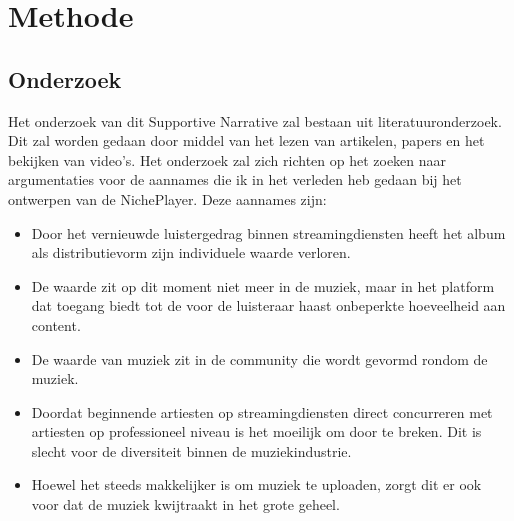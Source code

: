 \section{Methode}

\subsection{Onderzoek}

Het onderzoek van dit Supportive Narrative zal bestaan uit literatuuronderzoek. Dit zal worden gedaan door middel van het lezen van artikelen, papers en het bekijken van video's.
Het onderzoek zal zich richten op het zoeken naar argumentaties voor de aannames die ik in het verleden heb gedaan bij het ontwerpen van de NichePlayer. Deze aannames zijn:

\begin{itemize}
  \item Door het vernieuwde luistergedrag binnen streamingdiensten heeft het album als distributievorm zijn individuele waarde verloren.
  \item De waarde zit op dit moment niet meer in de muziek, maar in het platform dat toegang biedt tot de voor de luisteraar haast onbeperkte hoeveelheid aan content.
  \item De waarde van muziek zit in de community die wordt gevormd rondom de muziek.
  \item Doordat beginnende artiesten op streamingdiensten direct concurreren met artiesten op professioneel niveau is het moeilijk om door te breken. Dit is slecht voor de diversiteit binnen de muziekindustrie.
  \item Hoewel het steeds makkelijker is om muziek te uploaden, zorgt dit er ook voor dat de muziek kwijtraakt in het grote geheel.
\end{itemize}

